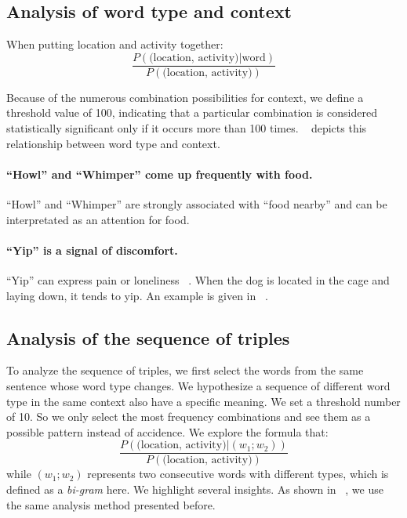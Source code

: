 \subsection{Analysis of word type and context}
When putting location and activity together:
\begin{equation}
\frac{P (\text{(location, activity)}| \text{word})}{P(\text{(location, activity)})}
\end{equation}

Because of the numerous combination possibilities for context, we define a threshold value of 100, indicating that a particular combination is considered statistically significant only if it occurs more than 100 times.
~ depicts this 
relationship between word type and context.



\paragraph{``Howl'' and ``Whimper'' come up frequently with food.} ``Howl'' and ``Whimper'' are strongly associated with ``food nearby'' and can be interpretated as an attention for food.
\paragraph{``Yip'' is a signal of discomfort.}  ``Yip'' can express pain or loneliness ~\cite{yeon2007vocal,web2018yip}. When the dog is located in the cage and laying down, it tends to yip. An example is given in ~.




\subsection{Analysis of the sequence of triples}
To analyze the sequence of triples, we first select the words from the same sentence whose word type changes. We hypothesize a sequence of different word type in the same context also have a specific meaning. We set a threshold number of 10. So we only select the most frequency combinations and see them as a possible pattern instead of accidence. We explore the formula that:
\begin{equation}
\frac{P (\text{(location, activity)}| (w_1;w_2))}{P(\text{(location, activity)})}
\end{equation}
while $(w_1;w_2)$ represents two consecutive words with different types,
which is defined as a \textit{bi-gram} here. We highlight several insights. 
As shown in ~, we use the same 
analysis method presented before. 

